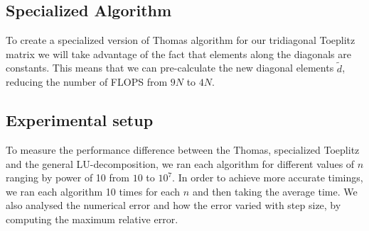 \subsection*{Specialized Algorithm}
To create a specialized version of Thomas algorithm for our tridiagonal Toeplitz
matrix we will take 
advantage of the fact that elements along the diagonals are constants. This
means that we can pre-calculate the new diagonal elements $\tilde{d}$, reducing
the number of FLOPS from $9N$ to $4N$.

\subsection*{Experimental setup}
To measure the performance difference between the Thomas, specialized
Toeplitz and the general LU-decomposition, we ran each algorithm for different
values of $n$ ranging by power of 10 from $10$ to $10^7$. In order to achieve
more accurate timings, we ran each algorithm 10 times for each $n$ and then
taking the average time. We also analysed the numerical error and how the error
varied with step size, by computing the maximum relative error.      